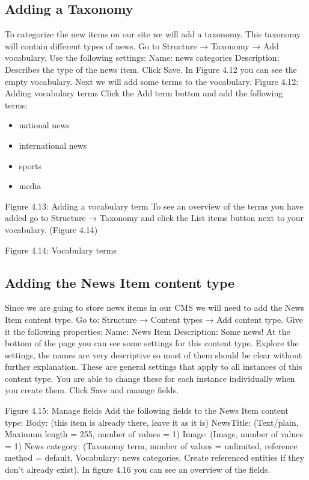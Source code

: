 \subsection{Adding a Taxonomy}
To categorize the new items on our site we will add a taxonomy. This taxonomy will contain different types of news. Go to Structure → Taxonomy → Add vocabulary. Use the following settings:
Name: news categories
Description: Describes the type of the news item.
Click Save. In Figure 4.12 you can see the empty vocabulary. Next we will add some terms to the vocabulary. 
Figure 4.12: Adding vocabulary terms
Click the Add term button and add the following terms:
\begin{itemize}
    \item national news
    \item international news
    \item sports 
    \item media
\end{itemize}


Figure 4.13: Adding a vocabulary term
To see an overview of the terms you have added go to Structure → Taxonomy and click the List items button next to your vocabulary. (Figure 4.14)

Figure 4.14: Vocabulary terms
\subsection{Adding the News Item content type}
Since we are going to store news items in our CMS we will need to add the News Item content type. Go to: Structure → Content types → Add content type.
Give it the following properties:
Name: News Item
Description: Some news!
At the bottom of the page you can see some settings for this content type. Explore the settings, the names are very descriptive so most of them should be clear without further explanation. These are general settings that apply to all instances of this content type. You are able to change these for each instance individually when you create them.
Click Save and manage fields.

Figure 4.15: Manage fields
Add the following fields to the News Item content type: 
Body: (this item is already there, leave it as it is)
NewsTitle: (Text/plain, Maximum length = 255, number of values = 1) 
Image: (Image, number of values = 1)
News category: (Taxonomy term, number of values = unlimited, reference method = default, Vocabulary: news categories, Create referenced entities if they don’t already exist).
In figure 4.16 you can see an overview of the fields.

